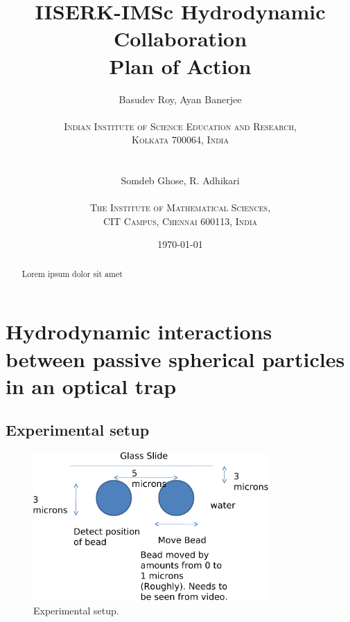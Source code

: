 \documentclass[a4paper, 11pt]{article}
\title{\textsf{\Huge IISERK-IMSc Hydrodynamic Collaboration \\ Plan of Action}}
\author
  {\textsf{Basudev Roy, Ayan Banerjee} \\ \\
   \textsc{Indian Institute of Science Education and Research,} \\
   \textsc{Kolkata 700064, India} \\ \\ \\
   \textsf{Somdeb Ghose, R. Adhikari} \\ \\
   \textsc{The Institute of Mathematical Sciences,} \\
   \textsc{CIT Campus, Chennai 600113, India} 
  }
\date{\today}
\begin{document}
\maketitle

\begin{abstract}
Lorem ipsum dolor sit amet
\end{abstract}

\newpage
\section{Hydrodynamic interactions between passive spherical particles in an optical trap}

\subsection{Experimental setup}

\begin{figure}[h!]
\begin{center}
    \includegraphics[width=0.80\textwidth]{HI_setup}
%     
  \caption{ Experimental setup.
  \label{fig:expt_setup_two_spheres}}
\end{center}
\end{figure}
\end{document}

